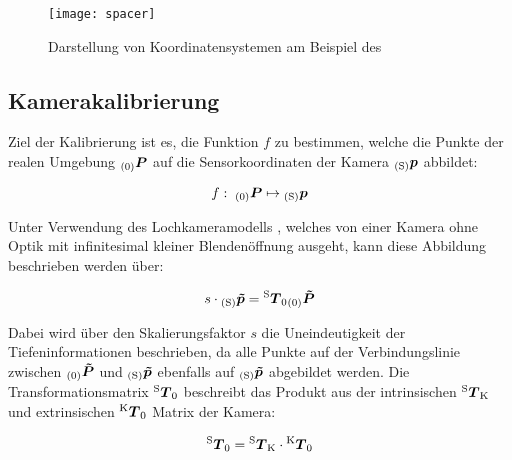 \begin{figure}[ht]
	\begin{center}
		\texttt{[image: spacer]}
		\caption{Darstellung von Koordinatensystemen am Beispiel des }
		\label{fig.coords}
	\end{center}
\end{figure}

\subsection{Kamerakalibrierung}
Ziel der Kalibrierung ist es, die Funktion $f$ zu bestimmen, welche die Punkte der realen Umgebung ${_{{\mathrm{(0)}}}}\mbox{\boldmath{$P$}}$ auf die Sensorkoordinaten der Kamera ${_{{\mathrm{(S)}}}}\mbox{\boldmath{$p$}}$ abbildet:

\begin{equation}
f : \; {_{{\mathrm{(0)}}}}\mbox{\boldmath{$P$}} \mapsto {_{{\mathrm{(S)}}}}\mbox{\boldmath{$p$}}
\end{equation}

Unter Verwendung des Lochkameramodells , welches von einer Kamera ohne Optik mit infinitesimal kleiner Blendenöffnung ausgeht, kann diese Abbildung beschrieben werden über:

\begin{equation}
s \cdot {_{{\mathrm{(S)}}}}\mbox{\boldmath{$\tilde{p}$}} = {^{\mathrm{S}}\mbox{\boldmath{$T$}}_{\mathrm{0}}}{_{{\mathrm{(0)}}}}\mbox{\boldmath{$\tilde{P}$}}
\end{equation}

Dabei wird über den Skalierungsfaktor $s$ die Uneindeutigkeit der Tiefeninformationen beschrieben, da alle Punkte auf der Verbindungslinie zwischen ${_{{\mathrm{(0)}}}}\mbox{\boldmath{$\tilde{P}$}}$ und ${_{{\mathrm{(S)}}}}\mbox{\boldmath{$\tilde{p}$}}$ ebenfalls auf ${_{{\mathrm{(S)}}}}\mbox{\boldmath{$\tilde{p}$}}$ abgebildet werden. Die Transformationsmatrix ${^{\mathrm{S}}\mbox{\boldmath{$T$}}_{\mathrm{0}}}$ beschreibt das Produkt aus der intrinsischen ${^{\mathrm{S}}\mbox{\boldmath{$T$}}_{\mathrm{K}}}$ und extrinsischen ${^{\mathrm{K}}\mbox{\boldmath{$T$}}_{\mathrm{0}}}$ Matrix der Kamera:


\begin{equation}
{^{\mathrm{S}}\mbox{\boldmath{$T$}}_{\mathrm{0}}} = {^{\mathrm{S}}\mbox{\boldmath{$T$}}_{\mathrm{K}}} \cdot {^{\mathrm{K}}\mbox{\boldmath{$T$}}_{\mathrm{0}}}
\end{equation}

